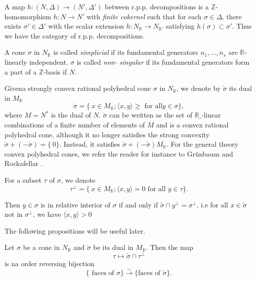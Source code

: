 \begin{defi*}
A map $h : (N , \Delta ) \to (N' , \Delta' )$ between
r.p.p. decompositions is a $\mathbb{Z}$- homomorphism $h : N \to N'$
with 
\textit{ finite cokernel } such that for each $\sigma \in \Delta$,
there exists $\sigma' \in \Delta'$ with the scalar extension $ h :
N_{\mathbb{R}}\rightarrow N_{\mathbb{R'}} $ satisfying $ h(\sigma)
\subset \sigma' $. Thus we have the category of r.p.p. decompositions. 
\end{defi*}

\begin{defi*}
A cone $\sigma$ in $N_{\mathbb{R}}$ is called \textit{ simplicial } if
its fundamental generators $n_1, \ldots, n_s$ are ${\mathbb{R}}$-
linearly independent. $\sigma$ is called \textit{ non- singular} if
its fundamental generators form a part of a ${\mathbb{Z}}$-basis if
$N$.  
\end{defi*}

Given\pageoriginale a strongly convex rational polyhedral cone
$\sigma$ in $N_{\mathbb{R}}$, we denote by $\check{\sigma}$ its dual in 
$M_{\mathbb{R}}$ 
$$
\check{\sigma} = \Big\{\ x \in M_{\mathbb{R}} ; \langle x, y\rangle
\geq \text{ for all} y \in \sigma\Big\},  
$$ 
where $M = N^*$ is the dual of $N$. $\check{\sigma}$ can be written as
the set of $\mathbb{R}_\circ$-linear combinations of a finite number
of elements of $M$ and is a convex rational polyhedral cone, although
it no longer satisfies the strong convexity $\check{\sigma} + (
-\check{\sigma}) = \Big\{\ 0 \Big\}$. Instead, it satisfies
$\check{\sigma} + ( -\check{\sigma}) M_{\mathbb{R}}$. For the general
theory convex polyhedral cones, we refer the reader for instance to
Gr\"{u}nbaum \cite{keyG3} and Rockafellar \cite{keyR3}.  

For a subset $\tau$ of $\sigma$, we denote 
$$
\tau^{\perp} = \Big\{ \ x \in M_{\mathbb{R}} ; \langle x , y \rangle =
0 \text{ for all } y \in \tau \Big\}.  
$$

\noindent
Then $y \in \sigma$ is in relative interior of $\sigma$ if and only if
$\check{\sigma} \cap y^{\perp} = \sigma^\perp $, i.e for all $x \in
\check{\sigma}$ not in $\sigma^\perp$, we have $ \langle x, y \rangle
> 0$ 

The following propositions will be useful later. 

\setcounter{prop}{0}
\begin{prop}\label{chap1:prop3.1} %
Let $\sigma$ be a cone in $N_{\mathbb{R}}$ and $\check{\sigma}$ be its
dual in $M_{\mathbb{R}}$. Then the map  
$$
\tau \longmapsto \check{\sigma} \cap \tau^\perp
$$
is na order reversing bijection 
$$
\Big\{ \text{ faces of } \sigma \Big\} \xrightarrow{\sim}\Big\{ \text{
  faces of } \check{\sigma} \Big\}. 
$$
\end{prop}

